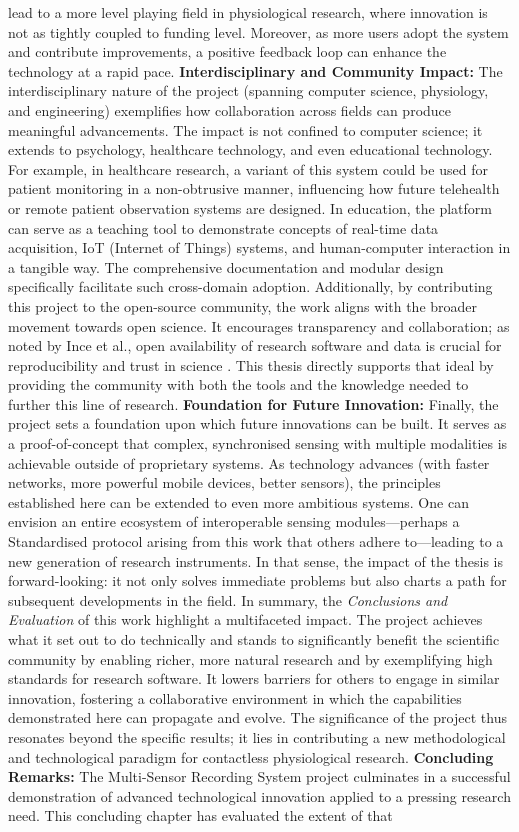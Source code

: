\documentclass[11pt,a4paper]{report}
\begin{document}
{lead to a more level playing field in physiological research, where innovation is not as tightly coupled to funding level. Moreover, as more users adopt the system and contribute improvements, a positive feedback loop can enhance the technology at a rapid pace. \textbf{Interdisciplinary and Community Impact:} The interdisciplinary nature of the project (spanning computer science, physiology, and engineering) exemplifies how collaboration across fields can produce meaningful advancements. The impact is not confined to computer science; it extends to psychology, healthcare technology, and even educational technology. For example, in healthcare research, a variant of this system could be used for patient monitoring in a non-obtrusive manner, influencing how future telehealth or remote patient observation systems are designed. In education, the platform can serve as a teaching tool to demonstrate concepts of real-time data acquisition, IoT (Internet of Things) systems, and human-computer interaction in a tangible way. The comprehensive documentation and modular design specifically facilitate such cross-domain adoption. Additionally, by contributing this project to the open-source community, the work aligns with the broader movement towards open science. It encourages transparency and collaboration; as noted by Ince et al., open availability of research software and data is crucial for reproducibility and trust in science \cite{Ince2012}. This thesis directly supports that ideal by providing the community with both the tools and the knowledge needed to further this line of research. \textbf{Foundation for Future Innovation:} Finally, the project sets a foundation upon which future innovations can be built. It serves as a proof-of-concept that complex, synchronised sensing with multiple modalities is achievable outside of proprietary systems. As technology advances (with faster networks, more powerful mobile devices, better sensors), the principles established here can be extended to even more ambitious systems. One can envision an entire ecosystem of interoperable sensing modules—perhaps a Standardised protocol arising from this work that others adhere to—leading to a new generation of research instruments. In that sense, the impact of the thesis is forward-looking: it not only solves immediate problems but also charts a path for subsequent developments in the field. In summary, the \textit{Conclusions and Evaluation} of this work highlight a multifaceted impact. The project achieves what it set out to do technically and stands to significantly benefit the scientific community by enabling richer, more natural research and by exemplifying high standards for research software. It lowers barriers for others to engage in similar innovation, fostering a collaborative environment in which the capabilities demonstrated here can propagate and evolve. The significance of the project thus resonates beyond the specific results; it lies in contributing a new methodological and technological paradigm for contactless physiological research. \noindent\textbf{Concluding Remarks:} The Multi-Sensor Recording System project culminates in a successful demonstration of advanced technological innovation applied to a pressing research need. This concluding chapter has evaluated the extent of that }
\end{document}
